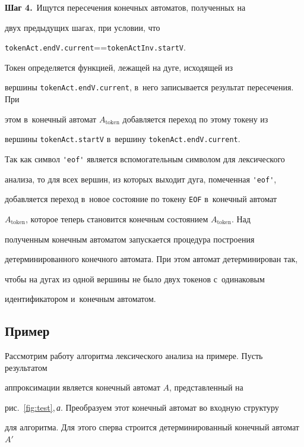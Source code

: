 \textbf{{Шаг 4.}}\ Ищутся пересечения конечных автоматов, полученных на 


двух предыдущих шагах, при условии, что  


\verb"tokenAct.endV.current"\;=\linebreak =\;\verb"tokenActInv.startV". 


Токен определяется функцией, лежащей на дуге, исходящей из 


вершины \verb"tokenAct.endV.current", в~него записывается результат пересечения. При 


этом в~конечный автомат $A_{\mathrm{token}}$ добавляется переход по этому токену из 


вершины \verb"tokenAct.startV" в~вершину \verb"tokenAct.endV.current".





Так как символ \verb"'eof'" является вспомогательным символом для лексического 


анализа, то для всех вершин, из которых выходит дуга, помеченная \verb"'eof'", 


добавляется переход в~новое состояние по токену \verb"EOF" в~конечный автомат 


$A_{\mathrm{token}}$, которое теперь становится конечным состоянием $A_{\mathrm{token}}$. Над 


полученным конечным автоматом запускается процедура построения 


детерминированного конечного автомата. При этом автомат детерминирован так, 


чтобы на дугах из одной вершины не было двух токенов с~одинаковым 


идентификатором и~конечным автоматом.





\subsection{Пример}





Рассмотрим работу алгоритма лексического анализа на примере. Пусть результатом 


аппроксимации является конечный автомат $A$, представленный на 


рис.~\ref{fig:test},\,\textit{а}. Преобразуем этот конечный автомат во входную структуру 


для алго\-рит\-ма. Для этого сперва строится детерминированный конечный автомат~$A'$ 



